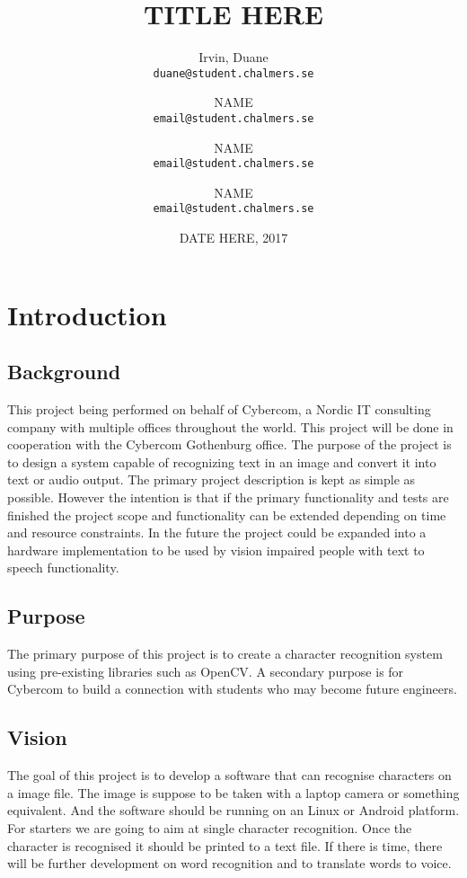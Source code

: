 \documentclass[a4paper, english]{scrartcl}
\title{TITLE HERE}
\author{Irvin, Duane \\ \texttt{duane@student.chalmers.se}
  \and NAME \\ \texttt{email@student.chalmers.se}
  \and NAME \\ \texttt{email@student.chalmers.se}
  \and NAME \\ \texttt{email@student.chalmers.se}
}
\date{DATE HERE, 2017}
\begin{document}
\clearpage\maketitle
\thispagestyle{empty}

\pagebreak

\setcounter{page}{1}
\hypersetup{linkcolor=black}
\tableofcontents

\pagebreak

\section{Introduction}
\subsection{Background}
This project being performed on behalf of Cybercom,
a Nordic IT consulting company with multiple offices throughout the world.
This project will be done in cooperation with the Cybercom Gothenburg office.
The purpose of the project is to design a system capable of recognizing text 
in an image and convert it into text or audio output. 
The primary project description is kept as simple as possible. 
However the intention is that if the primary functionality and tests are 
finished the project scope and functionality can be extended depending on 
time and resource constraints. 
In the future the project could be expanded into a hardware implementation 
to be used by vision impaired people with text to speech functionality.
\subsection{Purpose}
The primary purpose of this project is to create a character recognition
system using pre-existing libraries such as OpenCV. 
A secondary purpose is for Cybercom to build a connection with students 
who may become future engineers. 
\subsection{Vision}
The goal of this project is to develop a software that can recognise 
characters on a image file. 
The image is suppose to be taken with a laptop camera or something equivalent.
And the software should be running on an Linux or Android platform. 
For starters we are going to aim at single character recognition.
Once the character is recognised it should be printed to a text file.
If there is time, there will be further development on word recognition and
to translate words to voice.
\end{document}
